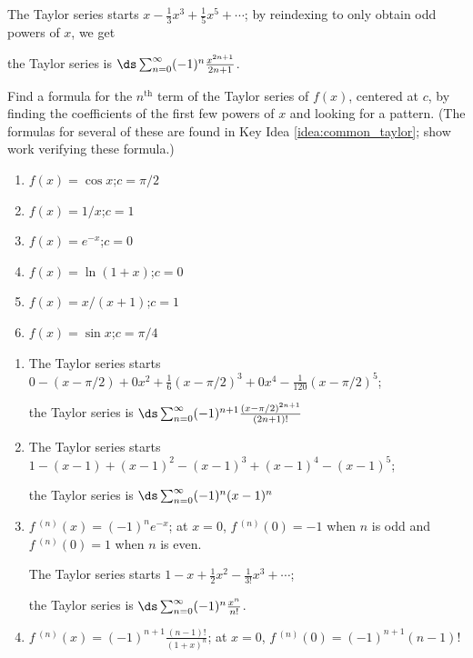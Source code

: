 \begin{enumialphparenastyle}
\begin{ex}
\begin{sol}
\begin{enumerate}
{The Taylor series starts $x-\frac13x^3+\frac15x^5+\cdots$; by reindexing to only obtain odd powers of $x$, we get 

the Taylor series is $\ds \sum_{n=0}^\infty (-1)^n\frac{x^{2n+1}}{2n+1}$.
}
\end{enumerate}
\end{sol}

\end{ex}


\begin{ex}
Find a formula for the $n^\text{th}$ term of the Taylor series of $f(x)$, centered at $c$, by finding the coefficients of the first few powers of $x$ and looking for a pattern. (The formulas for several of these are found in Key Idea \ref{idea:common_taylor}; show work verifying these formula.)
\begin{enumerate}
\item {$f(x) = \cos x$;\quad $c=\pi/2$
}
\item  {$f(x) = 1/x$;\quad $c=1$
}
\item {$f(x) = e^{-x}$;\quad $c=0$
}
\item {$f(x) = \ln(1+x)$;\quad $c=0$
}
\item {$f(x) = x/(x+1)$;\quad $c=1$
}
\item {$f(x) = \sin x$;\quad $c=\pi/4$
}
\end{enumerate}

\begin{sol}
\begin{enumerate}
\item 
{The Taylor series starts $0-(x-\pi/2)+0x^2+\frac16(x-\pi/2)^3+0x^4-\frac1{120}(x-\pi/2)^5$; 

the Taylor series is $\ds \sum_{n=0}^\infty (-1)^{n+1}\frac{(x-\pi/2)^{2n+1}}{(2n+1)!}$
}
\item
{The Taylor series starts $1-(x-1)+(x-1)^2-(x-1)^3+(x-1)^4-(x-1)^5$; 

the Taylor series is $\ds \sum_{n=0}^\infty (-1)^{n}(x-1)^n$
}
\item 
{$f\,^{(n)}(x) = (-1)^ne^{-x}$; at $x=0$, $f\,^{(n)}(0)=-1$ when $n$ is odd and $f\,^{(n)}(0)=1$ when $n$ is even.

The Taylor series starts $1-x+\frac12x^2-\frac1{3!}x^3+\cdots$; 

the Taylor series is $\ds \sum_{n=0}^\infty (-1)^n\frac{x^n}{n!}$.
}
\item 
{$f\,^{(n)}(x) = (-1)^{n+1}\frac{(n-1)!}{(1+x)^n}$; at $x=0$, $f\,^{(n)}(0)=(-1)^{n+1}(n-1)!$

}
\end{enumerate}
\end{sol}
\end{ex}
\end{enumialphparenastyle}
